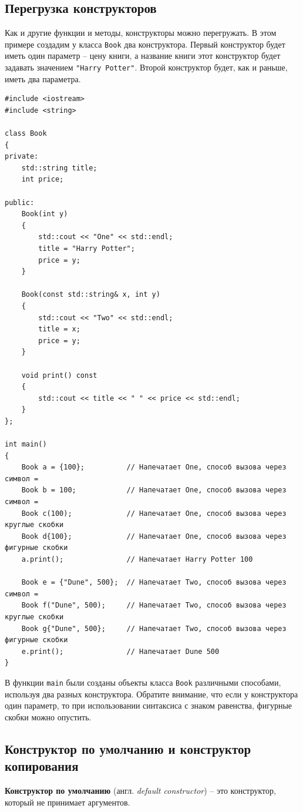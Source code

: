 \documentclass{article}
\begin{document}
\subsection*{Перегрузка конструкторов}
Как и другие функции и методы, конструкторы можно перегружать. В этом примере создадим у класса \texttt{Book} два конструктора. Первый конструктор будет иметь один параметр -- цену книги, а название книги этот конструктор будет задавать значением \texttt{"Harry Potter"}. Второй конструктор будет, как и раньше, иметь два параметра.
\begin{lstlisting}
#include <iostream>
#include <string>

class Book 
{
private:
    std::string title;
    int price;
    
public:
	Book(int y)
	{
		std::cout << "One" << std::endl;
		title = "Harry Potter";
		price = y;
	}

	Book(const std::string& x, int y)
	{
		std::cout << "Two" << std::endl;
		title = x;
		price = y;
	}

    void print() const
    {
        std::cout << title << " " << price << std::endl;
    }
};

int main() 
{
	Book a = {100};          // Напечатает One, способ вызова через символ =
	Book b = 100;            // Напечатает One, способ вызова через символ =
	Book c(100);             // Напечатает One, способ вызова через круглые скобки
	Book d{100};             // Напечатает One, способ вызова через фигурные скобки
	a.print();				 // Напечатает Harry Potter 100

    Book e = {"Dune", 500};  // Напечатает Two, способ вызова через символ =
    Book f("Dune", 500);     // Напечатает Two, способ вызова через круглые скобки
    Book g{"Dune", 500};     // Напечатает Two, способ вызова через фигурные скобки
	e.print();				 // Напечатает Dune 500
}
\end{lstlisting}
В функции \texttt{main} были созданы объекты класса \texttt{Book} различными способами, используя два разных конструктора. Обратите внимание, что если у конструктора один параметр, то при использовании синтаксиса с знаком равенства, фигурные скобки можно опустить.

\newpage


\subsection*{Конструктор по умолчанию и конструктор копирования}
\noindent \textbf{Конструктор по умолчанию} (англ. \textit{default constructor}) -- это конструктор, который не принимает аргументов.\\
\end{document}
